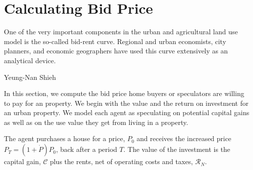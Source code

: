 \chapter[Bidding]{Calculating Bid Price}
\label{appendix-bid-price}
\epigraph{One of the very important components in the urban and agricultural land use model is the so-called \gls{bid-rent curve}. Regional and urban economists, city planners, and economic geographers have used this curve extensively as an analytical device.}{Yeung-Nan Shieh\cite{shiehWilhelmLaunhardtBidRent2004}}


 In this section, we compute the bid price home buyers or speculators are willing to pay for an property. We begin with the value and the return on investment for an urban property. We model each agent as %
 speculating on potential \glspl{capital gain} as well as on the \gls{use value} they get from living in a property. %

 The agent purchases a house for a price, $P_0$ %
 and receives the increased price $P_T = (1 + \dot P)P_0$, back after a period $T$. 
The value of the investment is the capital gain, $\mathcal{C}$ plus the rents, net of operating costs and taxes, $\mathcal{R}_N$.




